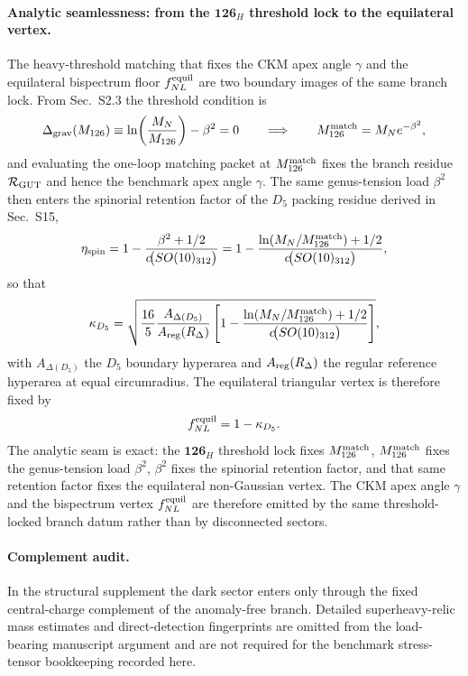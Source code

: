 \documentclass[11pt]{article}
\begin{document}
\paragraph{Analytic seamlessness: from the $\mathbf{126}_H$ threshold lock to the equilateral vertex.}
The heavy-threshold matching that fixes the CKM apex angle $\gamma$ and the
equilateral bispectrum floor $f_{NL}^{\rm equil}$ are two boundary images of the
same branch lock. From Sec.~S2.3 the threshold condition is
\begin{equation}
 \Delta_{\rm grav}(M_{126})
 \equiv
 \ln\!\left(\frac{M_N}{M_{126}}\right)-\beta^2
 =0
 \qquad\Longrightarrow\qquad
 M_{126}^{\rm match}=M_Ne^{-\beta^2},
\end{equation}
and evaluating the one-loop matching packet at $M_{126}^{\rm match}$ fixes the
branch residue $\mathcal R_{\rm GUT}$ and hence the benchmark apex angle
$\gamma$. The same genus-tension load $\beta^2$ then enters the spinorial
retention factor of the $D_5$ packing residue derived in Sec.~S15,
\begin{equation}
 \eta_{\rm spin}
 =
 1-\frac{\beta^2+1/2}{c\!\bigl(SO(10)_{312}\bigr)}
 =
 1-\frac{\ln(M_N/M_{126}^{\rm match})+1/2}{c\!\bigl(SO(10)_{312}\bigr)},
\end{equation}
so that
\begin{equation}
 \kappa_{D_5}
 =
 \sqrt{\frac{16}{5}
 \frac{A_{\Delta(D_5)}}{A_{\rm reg}(R_{\Delta})}
 \left[1-\frac{\ln(M_N/M_{126}^{\rm match})+1/2}{c\!\bigl(SO(10)_{312}\bigr)}\right]},
\end{equation}
with $A_{\Delta(D_5)}$ the $D_5$ boundary hyperarea and
$A_{\rm reg}(R_{\Delta})$ the regular reference hyperarea at equal circumradius.
The equilateral triangular vertex is therefore fixed by
\begin{equation}
 f_{NL}^{\rm equil}=1-\kappa_{D_5}.
\end{equation}
The analytic seam is exact: the $\mathbf{126}_H$ threshold lock fixes
$M_{126}^{\rm match}$, $M_{126}^{\rm match}$ fixes the genus-tension load
$\beta^2$, $\beta^2$ fixes the spinorial retention factor, and that same
retention factor fixes the equilateral non-Gaussian vertex. The CKM apex angle
$\gamma$ and the bispectrum vertex $f_{NL}^{\rm equil}$ are therefore emitted by
the same threshold-locked branch datum rather than by disconnected sectors.

\paragraph{Complement audit.} In the structural supplement the dark sector enters only through the fixed central-charge complement of the anomaly-free branch. Detailed superheavy-relic mass estimates and direct-detection fingerprints are omitted from the load-bearing manuscript argument and are not required for the benchmark stress-tensor bookkeeping recorded here.
\end{document}
